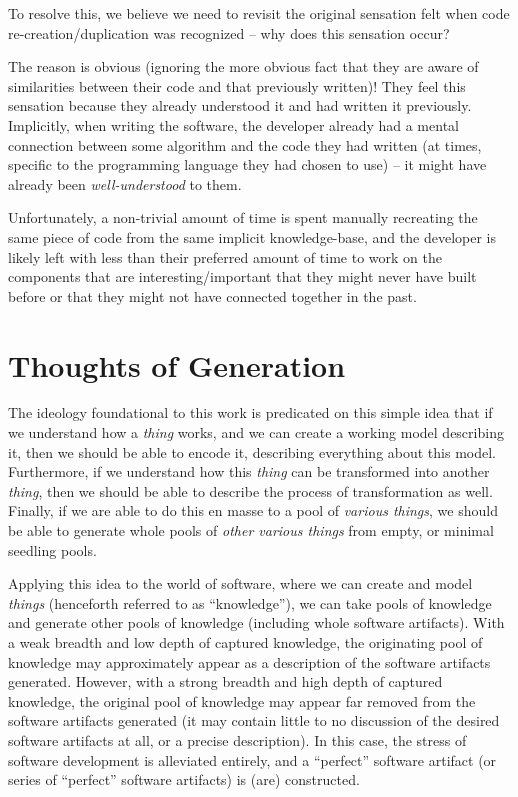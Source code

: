 To resolve this, we believe we need to revisit the original sensation felt when
code re-creation/duplication was recognized -- why does this sensation occur?

The reason is obvious (ignoring the more obvious fact that they are aware of
similarities between their code and that previously written)! They feel this
sensation because they already understood it and had written it previously.
Implicitly, when writing the software, the developer already had a mental
connection between some algorithm and the code they had written (at times,
specific to the programming language they had chosen to use) -- it might have
already been \textit{well-understood} to them.

Unfortunately, a non-trivial amount of time is spent manually recreating the
same piece of code from the same implicit knowledge-base, and the developer is
likely left with less than their preferred amount of time to work on the
components that are interesting/important that they might never have built
before or that they might not have connected together in the past.

\section{Thoughts of Generation}
\label{sec:idlgy:thoughts_of_generation}

The ideology foundational to this work is predicated on this simple idea that if
we understand how a \textit{thing} works, and we can create a working model
describing it, then we should be able to encode it, describing everything about
this model. Furthermore, if we understand how this \textit{thing} can be
transformed into another \textit{thing}, then we should be able to describe the
process of transformation as well. Finally, if we are able to do this en masse
to a pool of \textit{various things}, we should be able to generate whole pools
of \textit{other various things} from empty, or minimal seedling pools.

Applying this idea to the world of software, where we can create and model
\textit{things} (henceforth referred to as ``knowledge''), we can take pools of
knowledge and generate other pools of knowledge (including whole software
artifacts).  With a weak breadth and low depth of
captured knowledge, the originating pool of knowledge may approximately appear
as a description of the software artifacts generated. However, with a strong
breadth and high depth of captured knowledge, the original pool of knowledge may
appear far removed from the software artifacts generated (it may contain little
to no discussion of the desired software artifacts at all, or a precise
description). In this case, the stress of software development is alleviated
entirely, and a ``perfect'' software artifact (or series of ``perfect'' software
artifacts) is (are) constructed.

